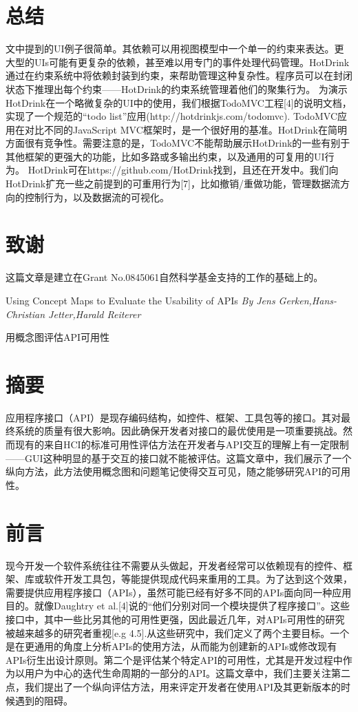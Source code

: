 \section*{总结}
文中提到的UI例子很简单。其依赖可以用视图模型中一个单一的约束来表达。更大型的UIs可能有更复杂的依赖，甚至难以用专门的事件处理代码管理。HotDrink通过在约束系统中将依赖封装到约束，来帮助管理这种复杂性。程序员可以在封闭状态下推理出每个约束——HotDrink的约束系统管理着他们的聚集行为。
为演示HotDrink在一个略微复杂的UI中的使用，我们根据TodoMVC工程[4]的说明文档，实现了一个规范的“todo list”应用(http://hotdrinkjs.com/todomvc). TodoMVC应用在对比不同的JavaScript MVC框架时，是一个很好用的基准。HotDrink在简明方面很有竞争性。需要注意的是，TodoMVC不能帮助展示HotDrink的一些有别于其他框架的更强大的功能，比如多路或多输出约束，以及通用的可复用的UI行为。
HotDrink可在https://github.com/HotDrink找到，且还在开发中。我们向HotDrink扩充一些之前提到的可重用行为[7]，比如撤销/重做功能，管理数据流方向的控制行为，以及数据流的可视化。
\section*{致谢}
这篇文章是建立在Grant No.0845061自然科学基金支持的工作的基础上的。



\newpage
\pagestyle{empty}

\begin{center}
{\heiti{}Using Concept Maps to Evaluate the Usability of APIs}
\textsl{By Jens Gerken,Hans-Christian Jetter,Harald Reiterer }

{\heiti{} 用概念图评估API可用性}
\end{center}


\section*{摘要}
应用程序接口（API）是现存编码结构，如控件、框架、工具包等的接口。其对最终系统的质量有很大影响。因此确保开发者对接口的最优使用是一项重要挑战。然而现有的来自HCI的标准可用性评估方法在开发者与API交互的理解上有一定限制——GUI这种明显的基于交互的接口就不能被评估。这篇文章中，我们展示了一个纵向方法，此方法使用概念图和问题笔记使得交互可见，随之能够研究API的可用性。

\section*{前言}
现今开发一个软件系统往往不需要从头做起，开发者经常可以依赖现有的控件、框架、库或软件开发工具包，等能提供现成代码来重用的工具。为了达到这个效果，需要提供应用程序接口（APIs），虽然可能已经有好多不同的APIs面向同一种应用目的。就像Daughtry et al.[4]说的“他们分别对同一个模块提供了程序接口”。这些接口中，其中一些比另其他的可用性更强，因此最近几年，对APIs可用性的研究被越来越多的研究者重视[e.g 4.5].从这些研究中，我们定义了两个主要目标。一个是在更通用的角度上分析APIs的使用方法，从而能为创建新的APIs或修改现有APIs衍生出设计原则。第二个是评估某个特定API的可用性，尤其是开发过程中作为以用户为中心的迭代生命周期的一部分的API。这篇文章中，我们主要关注第二点，我们提出了一个纵向评估方法，用来评定开发者在使用API及其更新版本的时候遇到的阻碍。
